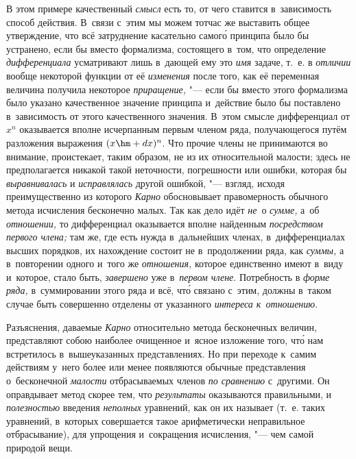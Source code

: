 В этом примере качественный {\em смысл} есть то, от чего ставится в~зависимость способ
действия. В~связи с~этим мы можем тотчас же выставить общее утверждение, что всё
затруднение касательно самог\'{о} принципа было бы устранено, если бы вместо
формализма, состоящего в~том, что определение {\em дифференциала} усматривают
лишь в~дающей ему это {\em имя} задаче, т.~е. в {\em отличии} вообще некоторой
функции от её {\em изменения} после того, как её переменная величина получила
некоторое {\em приращение,} "--- если бы вместо этого формализма было указано
качественное значение принципа и~действие было бы поставлено в~зависимость от
этого качественного значения. В~этом смысле дифференциал от $x^n$ оказывается
вполне исчерпанным первым членом ряда, получающегося путём разложения выражения
$(x\hm+dx)^n$. Что прочие члены не принимаются во внимание, проистекает, таким
образом, не из их относительной малости; здесь не предполагается никакой такой
неточности, погрешности или ошибки, которая бы {\em выравнивалась} и
{\em исправлялась} другой ошибкой, "--- взгляд, исходя преимущественно из
которого {\em Карно} обосновывает правомерность обычного метода исчисления бесконечно малых.
Так как дело идёт {\em не}~о {\em сумме,} а~об {\em отношении,}
то дифференциал оказывается вполне найденным {\em посредством первого члена;}
там же, где есть нужда в~дальнейших членах, в~дифференциалах
высших порядков, их нахождение состоит не в~продолжении ряда, как {\em суммы,}
а в~повторении одного и~того же {\em отношения,} которое единственно имеют
в~виду и~которое, стало быть, {\em завершено} уже в~{\em первом члене}.
Потребность в {\em форме ряда,} в~суммировании этого ряда и
всё, чт\'{о} связано с~этим, должны в~таком случае быть совершенно отделены от
указанного {\em интереса к~отношению}.

Разъяснения, даваемые {\em Карно} относительно метода бесконечных величин,
представляют собою наиболее очищенное и~ясное изложение того, чт\'{о} нам
встретилось в~вышеуказанных представлениях. Но при переходе к~самим действиям
у~него более или менее появляются обычные представления о~бесконечной
{\em малости} отбрасываемых членов {\em по сравнению} с~другими. Он
оправдывает метод скорее тем, что {\em результаты} оказываются правильными,
и {\em полезностью} введения {\em неполных} уравнений, как он их называет
(т.~е. таких уравнений, в~которых совершается такое арифметически неправильное
отбрасывание), для упрощения и~сокращения исчисления, "--- чем самой
природой вещи.

